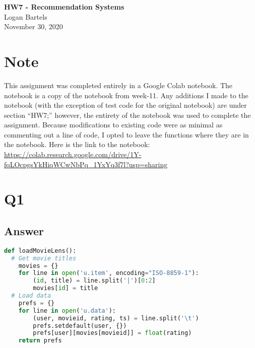 \documentclass[12pt]{article}
\begin{document}
\begin{centering}
{\large\textbf{HW7 - Recommendation Systems}}\\ %
Logan Bartels\\                     %
November 30, 2020\\                      %
\end{centering}


\section*{Note}
This assignment was completed entirely in a Google Colab notebook.  The notebook is a copy of the notebook from week-11.  Any additions I made to the notebook (with the exception of test code for the original notebook) are under section ``HW7;'' however, the entirety of the notebook was used to complete the assignment.  Because modifications to existing code were as minimal as commenting out a line of code, I opted to leave the functions where they are in the notebook.  Here is the link to the notebook:  \url{https://colab.research.google.com/drive/1Y-fqLOcpgsYkHiqWCwNbPq_1YxYq3f7l?usp=sharing} 
\section*{Q1}



\subsection*{Answer}

\begin{lstlisting}[language=Python, caption=Function to load data from u.item and u.data files., label=lst:load]
def loadMovieLens():
  # Get movie titles
    movies = {}
    for line in open('u.item', encoding="ISO-8859-1"):
        (id, title) = line.split('|')[0:2]
        movies[id] = title
  # Load data
    prefs = {}
    for line in open('u.data'):
        (user, movieid, rating, ts) = line.split('\t')
        prefs.setdefault(user, {})
        prefs[user][movies[movieid]] = float(rating)
    return prefs
\end{lstlisting}
\end{document}
